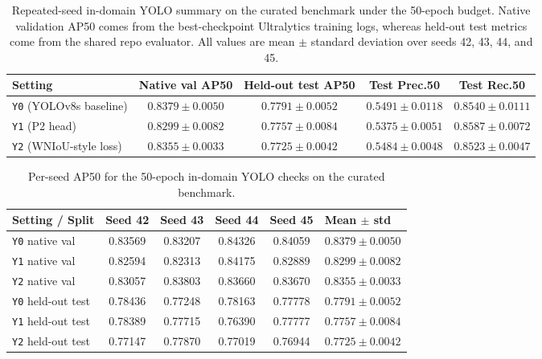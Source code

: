 \documentclass[journal,article,submit,moreauthors,pdftex]{Definitions/tsp}
\begin{document}
\begin{table}[t]
  \centering
  \caption{Repeated-seed in-domain YOLO summary on the curated benchmark under the 50-epoch budget. Native validation AP50 comes from the best-checkpoint Ultralytics training logs, whereas held-out test metrics come from the shared repo evaluator. All values are mean $\pm$ standard deviation over seeds 42, 43, 44, and 45.}
  \label{tab:app-curated-summary}
  \footnotesize
  \setlength{\tabcolsep}{4pt}
  \begin{tabularx}{\textwidth}{>{\raggedright\arraybackslash}p{} c c c c}
    \toprule
    Setting & Native val AP50 & Held-out test AP50 & Test Prec.50 & Test Rec.50 \\
    \midrule
    \texttt{Y0} (YOLOv8s baseline) & $0.8379 \pm 0.0050$ & $0.7791 \pm 0.0052$ & $0.5491 \pm 0.0118$ & $0.8540 \pm 0.0111$ \\
    \texttt{Y1} (P2 head) & $0.8299 \pm 0.0082$ & $0.7757 \pm 0.0084$ & $0.5375 \pm 0.0051$ & $0.8587 \pm 0.0072$ \\
    \texttt{Y2} (WNIoU-style loss) & $0.8355 \pm 0.0033$ & $0.7725 \pm 0.0042$ & $0.5484 \pm 0.0048$ & $0.8523 \pm 0.0047$ \\
    \bottomrule
  \end{tabularx}
\end{table}

\begin{table}[t]
  \centering
  \caption{Per-seed AP50 for the 50-epoch in-domain YOLO checks on the curated benchmark.}
  \label{tab:app-curated-perseed}
  \scriptsize
  \setlength{\tabcolsep}{4pt}
  \begin{tabularx}{\textwidth}{>{\raggedright\arraybackslash}p{} c c c c X}
    \toprule
    Setting / Split & Seed 42 & Seed 43 & Seed 44 & Seed 45 & Mean $\pm$ std \\
    \midrule
    \texttt{Y0} native val & 0.83569 & 0.83207 & 0.84326 & 0.84059 & $0.8379 \pm 0.0050$ \\
    \texttt{Y1} native val & 0.82594 & 0.82313 & 0.84175 & 0.82889 & $0.8299 \pm 0.0082$ \\
    \texttt{Y2} native val & 0.83057 & 0.83803 & 0.83660 & 0.83670 & $0.8355 \pm 0.0033$ \\
    \texttt{Y0} held-out test & 0.78436 & 0.77248 & 0.78163 & 0.77778 & $0.7791 \pm 0.0052$ \\
    \texttt{Y1} held-out test & 0.78389 & 0.77715 & 0.76390 & 0.77777 & $0.7757 \pm 0.0084$ \\
    \texttt{Y2} held-out test & 0.77147 & 0.77870 & 0.77019 & 0.76944 & $0.7725 \pm 0.0042$ \\
    \bottomrule
  \end{tabularx}
\end{table}
\end{document}
